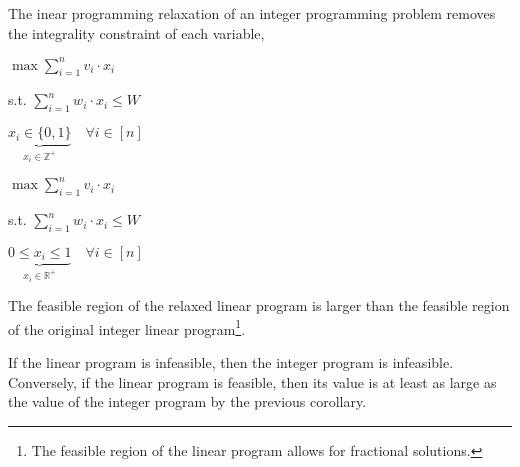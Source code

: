 \begin{rmk}
	The inear programming relaxation of an integer programming problem removes the integrality constraint of each variable,
	\begin{multicols}{2}
	$\max \sum_{i=1}^{n} v_{i} \cdot x_{i}$

	s.t. $\sum_{i=1}^{n} w_{i} \cdot x_{i} \leq W$

	$\underbrace{x_{i} \in\{0,1\}}_{x_i \in \mathbb{Z^+}} \quad \forall i \in[n]$

	$\max \sum_{i=1}^{n} v_{i} \cdot x_{i}$

	s.t. $\sum_{i=1}^{n} w_{i} \cdot x_{i} \leq W$

	$\underbrace{0 \leq x_{i} \leq 1}_{x_i \in \mathbb{R^+}} \quad \forall i \in[n]$
	\end{multicols}
\end{rmk}

\begin{cor}
	The feasible region of the relaxed linear program is larger than the feasible region of the original integer linear program\footnote{The feasible region of the linear program allows for fractional solutions.}.
\end{cor}

\begin{cor}
	If the linear program is infeasible, then the integer program is infeasible. Conversely, if the linear program is feasible, then its value is at least as large as the value of the integer program by the previous corollary.
\end{cor}

